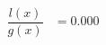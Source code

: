 \documentclass[preview]{standalone}
\begin{document}
\begin{align*}
\dfrac{l(x)}{g(x)} &= 0.000
\end{align*}
\end{document}
